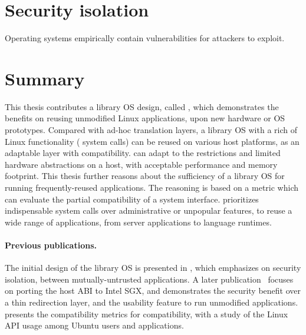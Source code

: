 \section{Security isolation}
\label{sec:intro:security}


Operating systems empirically contain vulnerabilities
for attackers to exploit.










\section{Summary}

This thesis contributes a library OS design, called \graphene{},
which demonstrates the benefits on reusing unmodified Linux applications, upon new hardware or OS prototypes.
Compared with ad-hoc translation layers,
a library OS with a rich of Linux functionality (\graphenesyscallnum{} system calls) can be reused on various host platforms, as an adaptable layer with compatibility.
\graphene{} can adapt to the restrictions and
limited hardware abstractions on a host, with acceptable performance and memory footprint.
This thesis further reasons about the sufficiency of a library OS
for running frequently-reused applications. The reasoning is based on a metric which can evaluate the partial compatibility of a system interface.
\graphene{} prioritizes indispensable system calls over administrative or unpopular features,
to reuse a wide range of applications, from server applications to language runtimes.


\paragraph{Previous publications.}
The initial design of the \graphene{} library OS is presented in \cite{tsai14graphene}, which emphasizes on security isolation, between mutually-untrusted applications.
A later publication~\cite{tsai17graphene-sgx} focuses on porting the host ABI
to Intel SGX, and demonstrates the security benefit 
over a thin redirection layer, and the usability feature to run unmodified applications.
\cite{tsai16apistudy} presents the compatibility metrics for compatibility,
with a study of the Linux API usage among Ubuntu users and applications.


